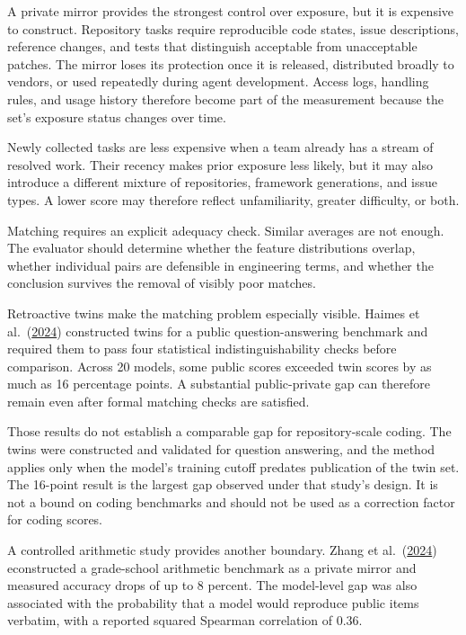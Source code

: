 A private mirror provides the strongest control over exposure, but it is expensive to construct. Repository tasks require reproducible code states, issue descriptions, reference changes, and tests that distinguish acceptable from unacceptable patches. The mirror loses its protection once it is released, distributed broadly to vendors, or used repeatedly during agent development. Access logs, handling rules, and usage history therefore become part of the measurement because the set's exposure status changes over time.

Newly collected tasks are less expensive when a team already has a stream of resolved work. Their recency makes prior exposure less likely, but it may also introduce a different mixture of repositories, framework generations, and issue types. A lower score may therefore reflect unfamiliarity, greater difficulty, or both.

Matching requires an explicit adequacy check. Similar averages are not enough. The evaluator should determine whether the feature distributions overlap, whether individual pairs are defensible in engineering terms, and whether the conclusion survives the removal of visibly poor matches.

Retroactive twins make the matching problem especially visible. Haimes et al.~(\href{https://arxiv.org/abs/2410.09247}{2024}) constructed twins for a public question-answering benchmark and required them to pass four statistical indistinguishability checks before comparison. Across 20 models, some public scores exceeded twin scores by as much as 16 percentage points. A substantial public-private gap can therefore remain even after formal matching checks are satisfied.

Those results do not establish a comparable gap for repository-scale coding. The twins were constructed and validated for question answering, and the method applies only when the model's training cutoff predates publication of the twin set. The 16-point result is the largest gap observed under that study's design. It is not a bound on coding benchmarks and should not be used as a correction factor for coding scores.

A controlled arithmetic study provides another boundary. Zhang et al.~(\href{https://arxiv.org/abs/2405.00332}{2024}) econstructed a grade-school arithmetic benchmark as a private mirror and measured accuracy drops of up to 8 percent. The model-level gap was also associated with the probability that a model would reproduce public items verbatim, with a reported squared Spearman correlation of 0.36.

